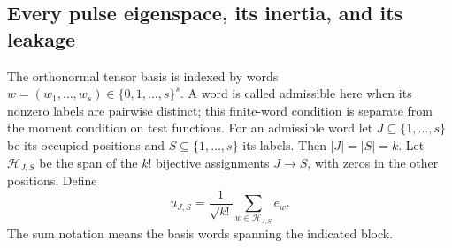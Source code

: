 \subsection{Every pulse eigenspace, its inertia, and its leakage}

The orthonormal tensor basis is indexed by words
$w=(w_1,\ldots,w_s)\in\{0,1,\ldots,s\}^s$.
A word is called admissible here when its nonzero labels are
pairwise distinct; this finite-word condition is separate from the
moment condition on test functions. For an admissible word let
$J\subseteq\{1,\ldots,s\}$ be its occupied positions and
$S\subseteq\{1,\ldots,s\}$ its labels. Then $|J|=|S|=k$.
Let $\mathcal H_{J,S}$ be the span of the $k!$ bijective
assignments $J\to S$, with zeros in the other positions.
Define
\begin{equation}\tag{FMS24}\label{fms:fms:blockvectors}
 u_{J,S}=\frac1{\sqrt{k!}}\sum_{w\in\mathcal H_{J,S}}e_w.
\end{equation}
The sum notation means the basis words spanning the indicated block.

